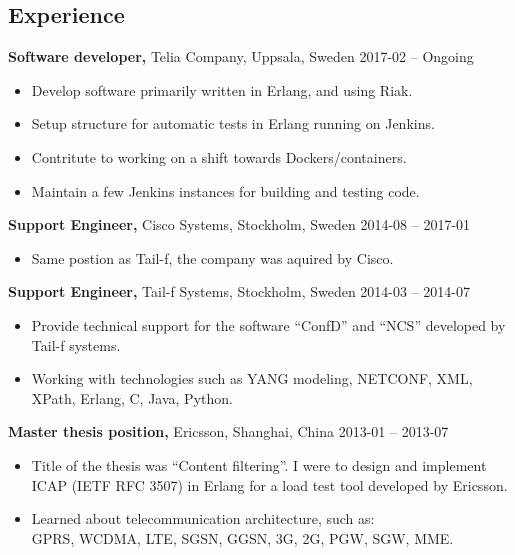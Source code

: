 \documentclass[margin]{res}
\begin{document}

\address{{\bf Contact information}\\

linkedin.com/in/tommymattsson\\
github.com/Taddic\\
}

\address{{\bf Address}\\
  \\
}

\begin{resume}

\section{Experience}
{\bf Software developer,} Telia Company, Uppsala, Sweden \hfill 2017-02 -- Ongoing
 \begin{itemize} \itemsep -2pt  %
 \item Develop software primarily written in Erlang, and using Riak.
 \item Setup structure for automatic tests in Erlang running on Jenkins.
 \item Contritute to working on a shift towards Dockers/containers.
 \item Maintain a few Jenkins instances for building and testing code.
 \end{itemize}

{\bf Support Engineer,} Cisco Systems, Stockholm, Sweden \hfill 2014-08 -- 2017-01
 \begin{itemize} \itemsep -2pt  %
 \item Same postion as Tail-f, the company was aquired by Cisco.
 \end{itemize}

{\bf Support Engineer,} Tail-f Systems, Stockholm, Sweden \hfill 2014-03 -- 2014-07
 \begin{itemize} \itemsep -2pt  %
 \item Provide technical support for the software ``ConfD'' and ``NCS''
   developed by Tail-f systems.
 \item Working with technologies such as YANG modeling, NETCONF,
   XML, XPath, Erlang, C, Java, Python.
 \end{itemize}

{\bf Master thesis position,} Ericsson, Shanghai, China \hfill 2013-01 -- 2013-07
 \begin{itemize} \itemsep -2pt  %
 \item Title of the thesis was ``Content filtering''. I were to design
   and implement ICAP (IETF RFC 3507) in Erlang for a load test tool
   developed by Ericsson.
 \item Learned about telecommunication architecture, such as: \\
 GPRS, WCDMA, LTE, SGSN, GGSN, 3G, 2G, PGW, SGW, MME.
 \end{itemize}


\end{resume}
\end{document}
